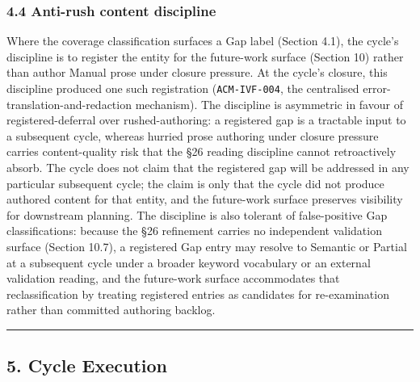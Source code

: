 \documentclass[
]{article}
\begin{document}
\subsubsection{4.4 Anti-rush content
discipline}\label{anti-rush-content-discipline}

Where the coverage classification surfaces a Gap label (Section 4.1),
the cycle's discipline is to register the entity for the future-work
surface (Section 10) rather than author Manual prose under closure
pressure. At the cycle's closure, this discipline produced one such
registration (\texttt{ACM-IVF-004}, the centralised
error-translation-and-redaction mechanism). The discipline is asymmetric
in favour of registered-deferral over rushed-authoring: a registered gap
is a tractable input to a subsequent cycle, whereas hurried prose
authoring under closure pressure carries content-quality risk that the
§26 reading discipline cannot retroactively absorb. The cycle does not
claim that the registered gap will be addressed in any particular
subsequent cycle; the claim is only that the cycle did not produce
authored content for that entity, and the future-work surface preserves
visibility for downstream planning. The discipline is also tolerant of
false-positive Gap classifications: because the §26 refinement carries
no independent validation surface (Section 10.7), a registered Gap entry
may resolve to Semantic or Partial at a subsequent cycle under a broader
keyword vocabulary or an external validation reading, and the
future-work surface accommodates that reclassification by treating
registered entries as candidates for re-examination rather than
committed authoring backlog.

\begin{center}\rule{0.5\linewidth}{0.5pt}\end{center}

\subsection{5. Cycle Execution}\label{cycle-execution}
\end{document}
